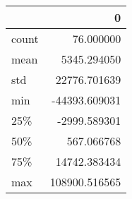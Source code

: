 \begin{tabular}{lr}
\toprule
{} &              0 \\
\midrule
count &      76.000000 \\
mean  &    5345.294050 \\
std   &   22776.701639 \\
min   &  -44393.609031 \\
25\%   &   -2999.589301 \\
50\%   &     567.066768 \\
75\%   &   14742.383434 \\
max   &  108900.516565 \\
\bottomrule
\end{tabular}
